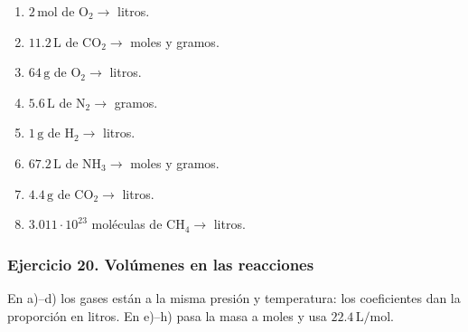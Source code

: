 \begin{enumerate}
    \item[a)] $2\,\mathrm{mol}$ de $\mathrm{O_2}\rightarrow$ litros.
    \item[b)] $11.2\,\mathrm{L}$ de $\mathrm{CO_2}\rightarrow$ moles y gramos.
    \item[c)] $64\,\mathrm{g}$ de $\mathrm{O_2}\rightarrow$ litros.
    \item[d)] $5.6\,\mathrm{L}$ de $\mathrm{N_2}\rightarrow$ gramos.
    \item[e)] $1\,\mathrm{g}$ de $\mathrm{H_2}\rightarrow$ litros.
    \item[f)] $67.2\,\mathrm{L}$ de $\mathrm{NH_3}\rightarrow$ moles y gramos.
    \item[g)] $4.4\,\mathrm{g}$ de $\mathrm{CO_2}\rightarrow$ litros.
    \item[h)] $3.011\cdot10^{23}$ moléculas de $\mathrm{CH_4}\rightarrow$ litros.
\end{enumerate}

\subsubsection*{Ejercicio 20. Volúmenes en las reacciones}

En a)--d) los gases están a la misma presión y temperatura:
los coeficientes dan la proporción en litros.
En e)--h) pasa la masa a moles y usa $22.4\,\mathrm{L/mol}$.

